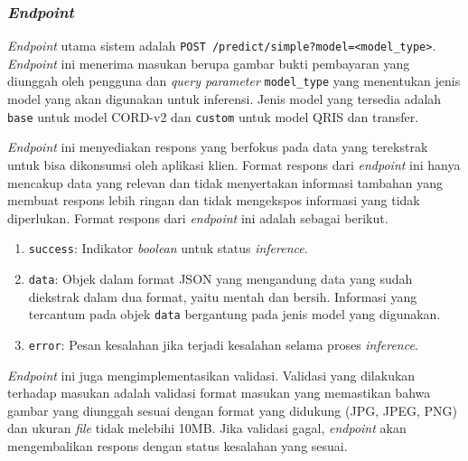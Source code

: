 
\subsubsection{\emph{Endpoint}}
\label{subsubsec:endpoint}

\emph{Endpoint} utama sistem adalah \texttt{POST /predict/simple?model=<model\_type>}. \emph{Endpoint} ini menerima masukan berupa gambar bukti pembayaran yang diunggah oleh pengguna dan \emph{query parameter} \texttt{model\_type} yang menentukan jenis model yang akan digunakan untuk inferensi. Jenis model yang tersedia adalah \texttt{base} untuk model \donut{} CORD-v2 dan \texttt{custom} untuk model \donut{} QRIS dan transfer.

\emph{Endpoint} ini menyediakan respons yang berfokus pada data yang terekstrak untuk bisa dikonsumsi oleh aplikasi klien. Format respons dari \emph{endpoint} ini hanya mencakup data yang relevan dan tidak menyertakan informasi tambahan yang membuat respons lebih ringan dan tidak mengekspos informasi yang tidak diperlukan. Format respons dari \emph{endpoint} ini adalah sebagai berikut.
\begin{enumerate}
    \item \texttt{success}: Indikator \emph{boolean} untuk status \emph{inference}.
    \item \texttt{data}: Objek dalam format JSON yang mengandung data yang sudah diekstrak dalam dua format, yaitu mentah dan bersih. Informasi yang tercantum pada objek \texttt{data} bergantung pada jenis model yang digunakan.
    \item \texttt{error}: Pesan kesalahan jika terjadi kesalahan selama proses \emph{inference}.
\end{enumerate}

\emph{Endpoint} ini juga mengimplementasikan validasi. Validasi yang dilakukan terhadap masukan adalah validasi format masukan yang memastikan bahwa gambar yang diunggah sesuai dengan format yang didukung (JPG, JPEG, PNG) dan ukuran \emph{file} tidak melebihi 10MB. Jika validasi gagal, \emph{endpoint} akan mengembalikan respons dengan status kesalahan yang sesuai.

